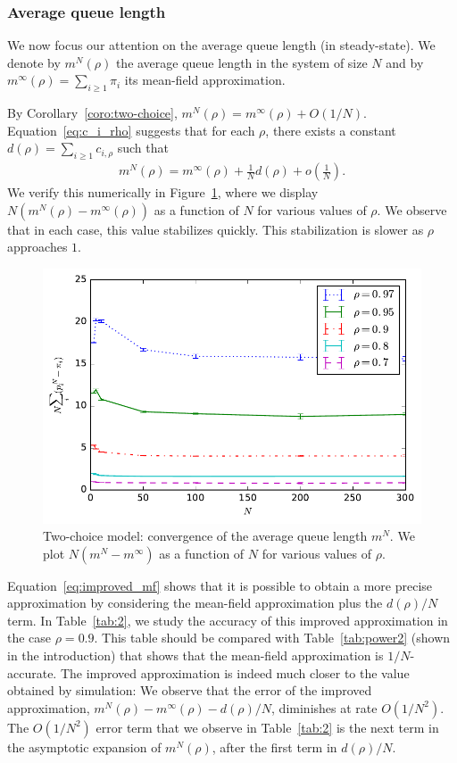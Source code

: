 \documentclass[sigconf]{acmart}
\newcommand\p[1]{\left(#1\right)}
\begin{document}
\subsubsection{Average queue length}


We now focus our attention on the average queue length (in
steady-state). We denote by $m^N(\rho)$ the average queue length in
the system of size $N$ and by $m^\infty(\rho)= \sum_{i\ge1}\pi_i$ its
mean-field approximation.

By Corollary~\ref{coro:two-choice},
$m^N(\rho) = m^\infty(\rho)+O(1/N)$. Equation~\eqref{eq:c_i_rho}
suggests that for each $\rho$, there exists a constant
$d(\rho)=\sum_{i\ge1}c_{i,\rho}$ such that
\begin{align}
  \label{eq:improved_mf}
  m^N(\rho)=m^\infty(\rho) + \frac{1}{N}d(\rho) + o\p{\frac1N}.
\end{align} 
We verify this numerically in Figure~\ref{fig:2-choice_mean}, where we
display $N(m^N(\rho)-m^\infty(\rho))$ as a function of $N$ for various
values of $\rho$.  We observe that in each case, this value stabilizes
quickly. This stabilization is slower as $\rho$ approaches $1$.

\begin{figure}[t]
  \centering
  \includegraphics[width=\linewidth]{2choice_convergence_mean_noLog}
  \caption{Two-choice model: convergence of the average queue length
    $m^N$. We plot $N(m^N-m^{\infty})$ as a function of $N$ for
    various values of $\rho$.  }
  \label{fig:2-choice_mean}
\end{figure}


Equation~\eqref{eq:improved_mf} shows that it is possible to obtain a
more precise approximation by considering the mean-field approximation
plus the $d(\rho)/N$ term. In Table~\ref{tab:2}, we study the accuracy
of this improved approximation in the case $\rho=0.9$. This table
should be compared with Table~\ref{tab:power2} (shown in the
introduction) that shows that the mean-field approximation is
$1/N$-accurate. The improved approximation is indeed much closer to
the value obtained by simulation: We observe that the error of the
improved approximation, $m^N(\rho)-m^{\infty}(\rho)-d(\rho)/N$,
diminishes at rate $O(1/N^2)$.  The $O(1/N^2)$ error term that we
observe in Table~\ref{tab:2} is the next term in the asymptotic
expansion of $m^N(\rho)$, after the first term in $d(\rho)/N$.
\end{document}
